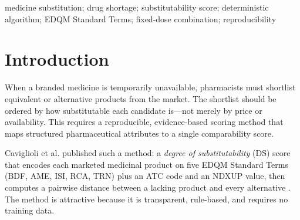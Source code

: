\documentclass[a4paper]{elsarticle}
\begin{document}
{\begin{frontmatter}
\begin{abstract}
\textbf{Results.} The implementation reproduces 26/32 published Table 8 DS scores under the paper-as-printed mode; all six failures are parenteral injections off by exactly 1.2152. Under a proposed reconciliation---a transposition of two adjacent Table 1 rows (TRA-0039/TRA-0040) inferred from the published scores---all 32 scores reproduce within rounding (max error 0.0293, ranking identical). Table 7 cannot be reproduced under a single unit convention (unit-aware: 3/5; literal: 4/5). All 196 assertions pass; scoring scales linearly at about 11 microseconds per candidate (90 ms at 8192 candidates).

\textbf{Conclusions.} The implementation independently reproduces the available labelled examples of the published specification under a documented interpretation, with honest documentation of where the published tables are internally inconsistent. The fixed-dose-combination extension is explicitly labelled as our own preliminary adaptation and is unvalidated against published ground truth. No clinical interchangeability or therapeutic-equivalence claim is made. The implementation, test suite, and generated outputs are available at \href{https://github.com/yashmahajan11234567/cmpb-medicine-substitution-scoring}{GitHub repository} (DOI: \href{https://doi.org/10.5281/zenodo.23774017}{10.5281/zenodo.23774017}).
\end{abstract}

\begin{keyword}
medicine substitution; drug shortage; substitutability score; deterministic algorithm; EDQM Standard Terms; fixed-dose combination; reproducibility
\end{keyword}

\end{frontmatter}
}

\twocolumn

\section{Introduction}
\label{sec:intro}

When a branded medicine is temporarily unavailable, pharmacists must shortlist equivalent or alternative products from the market. The shortlist should be ordered by how substitutable each candidate is---not merely by price or availability. This requires a reproducible, evidence-based scoring method that maps structured pharmaceutical attributes to a single comparability score.

Caviglioli et al.\citep{caviglioli2025medicine} published such a method: a \emph{degree of substitutability} (DS) score that encodes each marketed medicinal product on five EDQM Standard Terms (BDF, AME, ISI, RCA, TRN) plus an ATC code and an NDXUP value, then computes a pairwise distance between a lacking product and every alternative \citep{caviglioli2025medicine}. The method is attractive because it is transparent, rule-based, and requires no training data.
\end{document}

